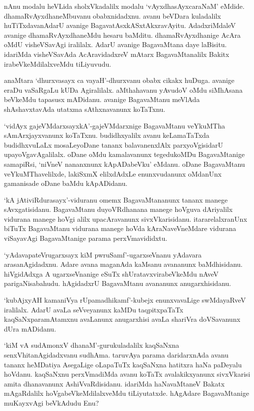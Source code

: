 nAnu modalu heVLida sholxVkadalilx modalu `vAyxdhasAyxcaraNaM' eMdide. dhamaRvAyxdhaneMbuvanu obabxnidadxnu. avanu beVDara kuladalilx huTiTxdavanAdarU avanige BagavatAsxkASxtAkxravAyitu. AdadxriMdaleV avanige dhamaRvAyxdhaneMdu hesaru baMditu. dhamaRvAyxdhanige AcAra oMdU visheVSavAgi iralilalx. AdarU avanige BagavaMtana daye laBisitu. idariMda visheVSavAda AcAravidadxreV mAtarx BagavaMtanalilx Bakitx irabeVkeMdilalxveMdu tiLiyuvudu.

anaMtara `dhurxvasayx ca vayaH'-dhurxvanu obabx cikakx huDuga. avanige eraDu vaSaRgaLu kUDa Agiralilalx. aMthahavanu yAvudoV oMdu siMhAsana beVkeMdu tapasusx mADidanu. avanige BagavaMtanu meVlAda shAshavxtavAda utatxma sAthxnavanunx koTaTxnu.

`vidAyx gajeVMdarxsayxkA'-gajeVMdarxnige BagavaMtanu veYkuMTha sAmArxjayxvanunx koTaTxnu. budidhxyalilx avanu keLamaTaTxda budidhxvuLaLx mosaLeyoDane tananx balavanenxlAlx parxyoVgisidarU upayoVgavAgalilalx. oDane oMdu kamalavanunx tegedukoMDu BagavaMtanige samapiRsi, `niVneV nananxnunx kApADabeVku' eMdanu. oDane BagavaMtanu veYkuMThavelilxde, lakiSxmX elilxdAdxLe enunxvudanunx oMdanUnx gamanisade oDane baMdu kApADidanu.

`kA jAtiviRdurasayx'-viduranu omemx BagavaMtananunx tananx manege sAvxgatisidanu. BagavaMtanu duyoVRdhanana manege hoVguva dAriyalilx vidurana manege hoVgi alilx upacAravanunx sivxVkarisidanu. itararelalxranUnx biTuTx BagavaMtanu vidurana manege hoVda kAraNaveVneMdare vidurana viSayavAgi BagavaMtanige parama perxVmavididxtu.

`yAdavapateVrugarxsayx kiM pwruSamf'-ugarxseVnanu yAdavara arasanAgidadxnu. Adare avana maganAda kaMsanu avananunx baMdhisidanu. hiVgidAdxga A ugarxseVnanige eSuTx shUratavxvirabeVkeMdu nAveV parigaNisabahudu. hAgidadxrU BagavaMtanu avananunx anugarxhisidanu.

`kubAjxyAH kamaniVya rUpamadhikamf'-kubejx enunxvavaLige swMdayaRveV iralilalx. AdarU avaLa seVveyanunx kaMDu taqpitxpaTaTx kaqSaNxparamAtamxnu avaLanunx anugarxhisi avaLa shariVra doVSavanunx dUra mADidanu.

`kiM vA sudAmonxV dhanaM'-gurukuladalilx kaqSaNxna senxVhitanAgidadxvanu sudhAma. taruvAya parama daridarxnAda avanu tananx heMDatiya AsegaLige oLapaTuTx kaqSaNxna hatitxra haNa paDeyalu hoVdanu. kaqSaNxnu perxVmadiMda avanu koTaTx avalakikxyanunx sivxVkarisi amita dhanavanunx AshiVvaRdisidanu. idariMda haNavaMtaneV Bakatx mAgaRdalilx hoVgabeVkeMdilalxveMdu tiLiyutatxde. hAgAdare BagavaMtanige muKayxvAgi beVkAdudu Enu?

